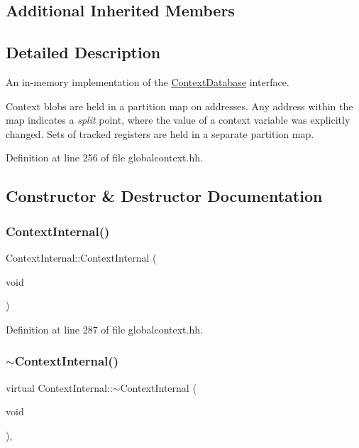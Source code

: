 \subsection*{Additional Inherited Members}


\subsection{Detailed Description}
An in-\/memory implementation of the \mbox{\hyperlink{class_context_database}{Context\+Database}} interface. 

Context blobs are held in a partition map on addresses. Any address within the map indicates a {\itshape split} point, where the value of a context variable was explicitly changed. Sets of tracked registers are held in a separate partition map. 

Definition at line 256 of file globalcontext.\+hh.



\subsection{Constructor \& Destructor Documentation}
\mbox{\label{class_context_internal_ade10c48863db0065138ada7171117280}} 
\subsubsection{\texorpdfstring{ContextInternal()}{ContextInternal()}}
{\footnotesize\ttfamily Context\+Internal\+::\+Context\+Internal (\begin{DoxyParamCaption}\item[{void}]{ }\end{DoxyParamCaption})\hspace{0.3cm}{\ttfamily [inline]}}



Definition at line 287 of file globalcontext.\+hh.

\mbox{\label{class_context_internal_a1df0ea7175c042853f5f0f6cd337f93a}} 
\subsubsection{\texorpdfstring{$\sim$ContextInternal()}{~ContextInternal()}}
{\footnotesize\ttfamily virtual Context\+Internal\+::$\sim$\+Context\+Internal (\begin{DoxyParamCaption}\item[{void}]{ }\end{DoxyParamCaption})\hspace{0.3cm}{\ttfamily [inline]}, {\ttfamily [virtual]}}



